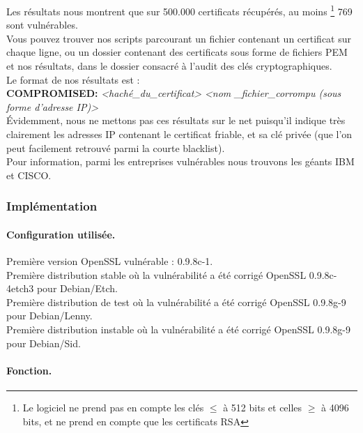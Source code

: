 			Les résultats nous montrent que sur 500.000 certificats récupérés, au moins
			\footnote{Le logiciel ne prend pas en compte les clés $\leq$ à 512 bits et 
			celles $\geq$ à 4096 bits, et ne prend en compte que les certificats RSA} 
			769 sont vulnérables.\\
			
			Vous pouvez trouver nos scripts parcourant un fichier contenant un 
			certificat sur chaque ligne, ou un dossier contenant des certificats sous 
			forme de fichiers PEM et nos résultats, dans le dossier consacré à l'audit des clés
			cryptographiques.\\
			
			Le format de nos résultats est : \\
			
			\textbf{COMPROMISED:} \textit{<haché\_du\_certificat>} \textit{<nom
			\_fichier\_corrompu (sous forme d'adresse IP)>}\\
			
			Évidemment, nous ne mettons pas ces résultats sur le net puisqu'il indique 
			très clairement les adresses IP contenant le certificat friable, et sa clé
			privée (que l'on peut facilement retrouvé parmi la courte blacklist).\\
			
			Pour information, parmi les entreprises vulnérables nous trouvons les géants
			IBM et CISCO.
	
		\subsubsection{Implémentation}
						
			\paragraph{Configuration utilisée.\\}
			
			Première version OpenSSL vulnérable : 0.9.8c-1.\\
			Première distribution stable où la vulnérabilité a été corrigé
			OpenSSL 0.9.8c-4etch3 pour Debian/Etch.\\	
			Première distribution de test où la vulnérabilité a été corrigé
			OpenSSL 0.9.8g-9 pour Debian/Lenny.\\
			Première distribution instable où la vulnérabilité a été corrigé
			OpenSSL 0.9.8g-9 pour Debian/Sid.\\
			
						
			\paragraph{Fonction.\\} 
			
